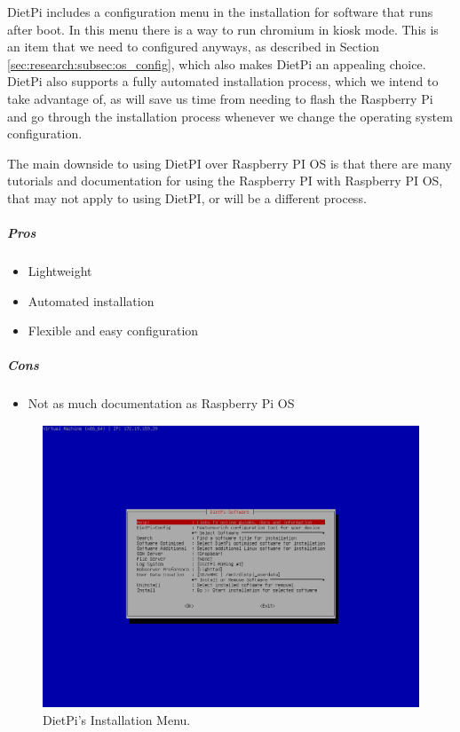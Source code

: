 DietPi includes a configuration menu in the installation for software that runs after
boot. In this menu there is a way to run chromium in kiosk mode. This is an item that we
need to configured anyways, as described in Section \ref{sec:research:subsec:os_config},
which also makes DietPi an appealing choice. DietPi also supports a fully automated
installation process, which we intend to take advantage of, as will save us time from
needing to flash the Raspberry Pi and go through the installation process whenever we
change the operating system configuration.

The main downside to using DietPI over Raspberry PI OS is that there are many tutorials
and documentation for using the Raspberry PI with Raspberry PI OS, that may not apply to
using DietPI, or will be a different process.

\subparagraph{Pros}
\begin{itemize}
  \item Lightweight
  \item Automated installation
  \item Flexible and easy configuration
\end{itemize}

\subparagraph{Cons}
\begin{itemize}
  \item Not as much documentation as Raspberry Pi OS
\end{itemize}

\begin{figure}[h!]
  \centering
  \includegraphics[width=\linewidth]{image/dietpi-config.png}
  \caption{DietPi's Installation Menu.}
  \label{fig:dietpi}
\end{figure}


